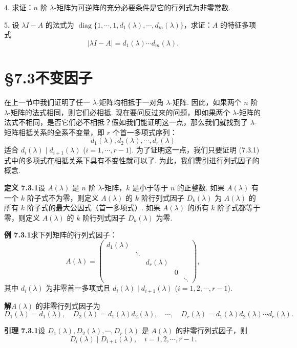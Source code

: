 \documentclass[UTF8, 12pt, fontset=fandol, oneside]{ctexart}
\begin{document}
4. 求证：$n$ 阶 $\lambda$-矩阵为可逆阵的充分必要条件是它的行列式为非零常数.

5. 设 $\lambda I-A$ 的法式为 $\operatorname{diag}\{1,\cdots,1,d_1(\lambda),\cdots,d_m(\lambda)\}$，求证：$A$ 的特征多项式
\[
|\lambda I-A|=d_1(\lambda)\cdots d_m(\lambda).
\]

\section*{§7.3\quad 不变因子}

在上一节中我们证明了任一 $\lambda$-矩阵均相抵于一对角 $\lambda$-矩阵. 因此，如果两个 $n$ 阶 $\lambda$-矩阵的法式相同，则它们必相抵. 现在要问反过来的问题，即如果两个 $\lambda$-矩阵的法式不相同，是否它们必不相抵？假如我们能证明这一点，那么我们就找到了 $\lambda$-矩阵相抵关系的全系不变量，即 $r$ 个首一多项式序列：
\begin{equation}
d_1(\lambda),d_2(\lambda),\cdots,d_r(\lambda)
\tag{7.3.1}
\end{equation}
适合 $d_i(\lambda)\mid d_{i+1}(\lambda)$ ($i=1,\cdots,r-1$). 为了证明这一点，我们只要证明 (7.3.1) 式中的多项式在相抵关系下具有不变性就可以了. 为此，我们需引进行列式因子的概念.

\noindent\textbf{定义 7.3.1}\quad 设 $A(\lambda)$ 是 $n$ 阶 $\lambda$-矩阵，$k$ 是小于等于 $n$ 的正整数. 如果 $A(\lambda)$ 有一个 $k$ 阶子式不为零，则定义 $A(\lambda)$ 的 $k$ 阶行列式因子 $D_k(\lambda)$ 为 $A(\lambda)$ 的所有 $k$ 阶子式的最大公因式（首一多项式）. 如果 $A(\lambda)$ 的所有 $k$ 阶子式都等于零，则定义 $A(\lambda)$ 的 $k$ 阶行列式因子 $D_k(\lambda)$ 为零.

\noindent\textbf{例 7.3.1}\quad 求下列矩阵的行列式因子：
\[
A(\lambda)=
\left(\begin{array}{ccccc}
d_1(\lambda) & & & & \\
& \ddots & & & \\
& & d_r(\lambda) & & \\
& & & 0 & \\
& & & & \ddots
\end{array}\right),
\]
其中 $d_i(\lambda)$ 为非零首一多项式且 $d_i(\lambda)\mid d_{i+1}(\lambda)$ ($i=1,2,\cdots,r-1$).

\noindent\textbf{解}\quad $A(\lambda)$ 的非零行列式因子为
\[
D_1(\lambda)=d_1(\lambda),\quad D_2(\lambda)=d_1(\lambda)d_2(\lambda),\quad \cdots,\quad D_r(\lambda)=d_1(\lambda)d_2(\lambda)\cdots d_r(\lambda).
\]

\noindent\textbf{引理 7.3.1}\quad 设 $D_1(\lambda),D_2(\lambda),\cdots,D_r(\lambda)$ 是 $A(\lambda)$ 的非零行列式因子，则
\[
D_i(\lambda)\mid D_{i+1}(\lambda),\quad i=1,2,\cdots,r-1.
\]
\end{document}
